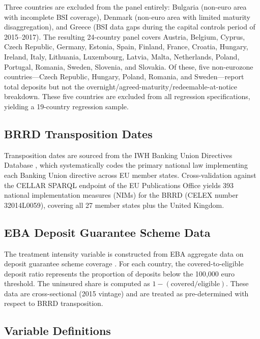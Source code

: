 \documentclass[12pt]{article}
\begin{document}
Three countries are excluded from the panel entirely: Bulgaria (non-euro area with incomplete BSI coverage), Denmark (non-euro area with limited maturity disaggregation), and Greece (BSI data gaps during the capital controls period of 2015--2017). The resulting 24-country panel covers Austria, Belgium, Cyprus, Czech Republic, Germany, Estonia, Spain, Finland, France, Croatia, Hungary, Ireland, Italy, Lithuania, Luxembourg, Latvia, Malta, Netherlands, Poland, Portugal, Romania, Sweden, Slovenia, and Slovakia. Of these, five non-eurozone countries---Czech Republic, Hungary, Poland, Romania, and Sweden---report total deposits but not the overnight/agreed-maturity/redeemable-at-notice breakdown. These five countries are excluded from all regression specifications, yielding a 19-country regression sample.

\subsection{BRRD Transposition Dates}

Transposition dates are sourced from the IWH Banking Union Directives Database \citep{deroth2022iwh}, which systematically codes the primary national law implementing each Banking Union directive across EU member states. Cross-validation against the CELLAR SPARQL endpoint of the EU Publications Office yields 393 national implementation measures (NIMs) for the BRRD (CELEX number 32014L0059), covering all 27 member states plus the United Kingdom.



\subsection{EBA Deposit Guarantee Scheme Data}

The treatment intensity variable is constructed from EBA aggregate data on deposit guarantee scheme coverage \citep{eba2015dgs}. For each country, the covered-to-eligible deposit ratio represents the proportion of deposits below the 100{,}000 euro threshold. The uninsured share is computed as $1 - (\text{covered} / \text{eligible})$. These data are cross-sectional (2015 vintage) and are treated as pre-determined with respect to BRRD transposition.

\subsection{Variable Definitions}
\end{document}
